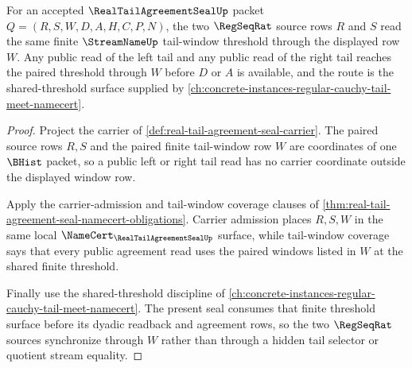 \begin{theorem}
\label{thm:real-tail-agreement-seal-left-right-threshold-synchrony}
For an accepted $\RealTailAgreementSealUp$ packet $Q=(R,S,W,D,A,H,C,P,N)$, the two $\RegSeqRat$ source rows $R$ and $S$ read the same finite $\StreamNameUp$ tail-window threshold through the displayed row $W$. Any public read of the left tail and any public read of the right tail reaches the paired threshold through $W$ before $D$ or $A$ is available, and the route is the shared-threshold surface supplied by \autoref{ch:concrete-instances-regular-cauchy-tail-meet-namecert}.
\end{theorem}
\begin{proof}
Project the carrier of \autoref{def:real-tail-agreement-seal-carrier}. The paired source rows $R,S$ and the paired finite tail-window row $W$ are coordinates of one $\BHist$ packet, so a public left or right tail read has no carrier coordinate outside the displayed window row.

Apply the carrier-admission and tail-window coverage clauses of \autoref{thm:real-tail-agreement-seal-namecert-obligations}. Carrier admission places $R,S,W$ in the same local $\NameCert_{\RealTailAgreementSealUp}$ surface, while tail-window coverage says that every public agreement read uses the paired windows listed in $W$ at the shared finite threshold.

Finally use the shared-threshold discipline of \autoref{ch:concrete-instances-regular-cauchy-tail-meet-namecert}. The present seal consumes that finite threshold surface before its dyadic readback and agreement rows, so the two $\RegSeqRat$ sources synchronize through $W$ rather than through a hidden tail selector or quotient stream equality.
\end{proof}

